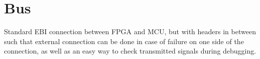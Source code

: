 \documentclass[../main/report.tex]{subfiles}
\begin{document}
\section{Bus}
Standard EBI connection between FPGA and MCU, but with headers in between such that external connection can be done in case of failure on one side of the connection, as well as an easy way to check transmitted signals during debugging.
\end{document}

